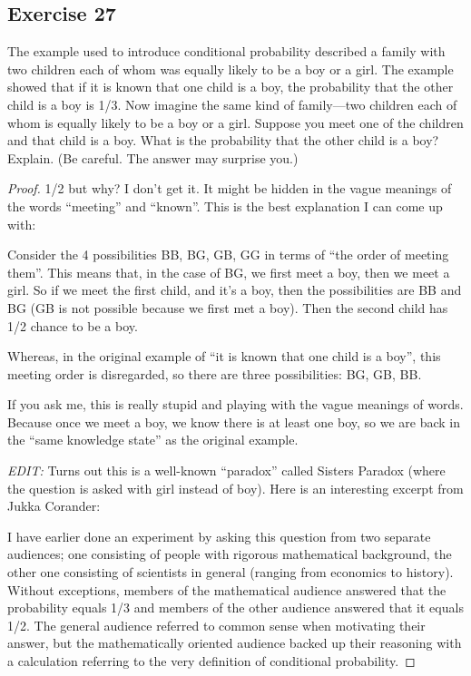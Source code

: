 \documentclass[14pt]{extarticle}
\begin{document}
\subsection{Exercise 27}
The example used to introduce conditional probability described a family with two children each of whom was equally
likely to be a boy or a girl. The example showed that if it is known that one child is a boy, the probability that the other
child is a boy is 1/3. Now imagine the same kind of family—two children each of whom is equally likely to be a boy or a girl.
Suppose you meet one of the children and that child is a boy. What is the probability that the other child is a boy?
Explain. (Be careful. The answer may surprise you.)

\begin{proof}
     1/2 but why? I don't get it. It might be hidden in the vague meanings of the words ``meeting'' and ``known''. This is the
     best explanation I can come up with:

     Consider the 4 possibilities BB, BG, GB, GG in terms of ``the order of meeting them''. This means that, in the case of BG,
     we first meet a boy, then we meet a girl. So if we meet the first child, and it's a boy, then the possibilities are BB and
     BG (GB is not possible because we first met a boy). Then the second child has 1/2 chance to be a boy.

     Whereas, in the original example of ``it is known that one child is a boy'', this meeting order is disregarded, so there
     are three possibilities: BG, GB, BB.

     If you ask me, this is really stupid and playing with the vague meanings of words. Because once we meet a boy, we know
     there is at least one boy, so we are back in the ``same knowledge state'' as the original example.

          {\it EDIT:} Turns out this is a well-known ``paradox'' called Sisters Paradox (where the question is asked with girl instead
     of boy). Here is an interesting excerpt from Jukka Corander:

     I have earlier done an experiment by asking this question from two separate audiences; one consisting of people with rigorous
     mathematical background, the other one consisting of scientists in general (ranging from economics to history).
     Without exceptions, members of the mathematical audience answered that the probability equals 1/3 and members of the
     other audience answered that it equals 1/2. The general audience referred to common sense when motivating their
     answer, but the mathematically oriented audience backed up their reasoning with a calculation referring to the very
     definition of conditional probability.


\end{proof}
\end{document}
